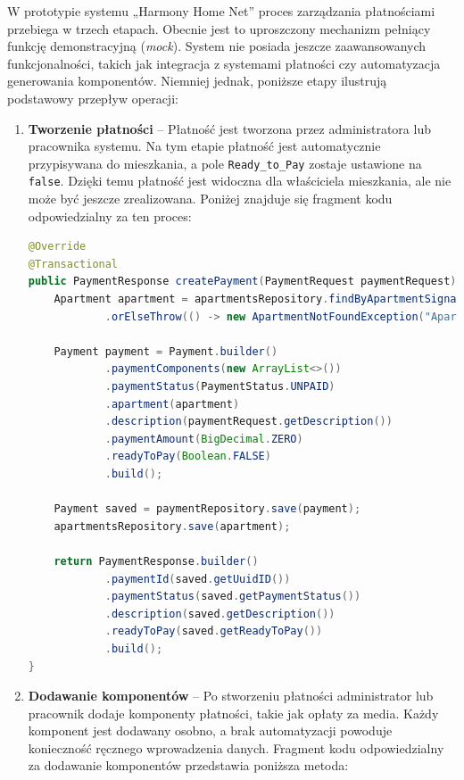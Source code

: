 W prototypie systemu „Harmony Home Net” proces zarządzania płatnościami przebiega w trzech etapach. Obecnie jest to uproszczony mechanizm pełniący funkcję demonstracyjną (\emph{mock}). System nie posiada jeszcze zaawansowanych funkcjonalności, takich jak integracja z systemami płatności czy automatyzacja generowania komponentów. Niemniej jednak, poniższe etapy ilustrują podstawowy przepływ operacji:

\begin{enumerate}
    \item \textbf{Tworzenie płatności} -- Płatność jest tworzona przez administratora lub pracownika systemu. Na tym etapie płatność jest automatycznie przypisywana do mieszkania, a pole \texttt{Ready\_to\_Pay} zostaje ustawione na \texttt{false}. Dzięki temu płatność jest widoczna dla właściciela mieszkania, ale nie może być jeszcze zrealizowana. Poniżej znajduje się fragment kodu odpowiedzialny za ten proces:

\begin{lstlisting}[language=Java, caption=Fragment metody \texttt{createPayment}]
@Override
@Transactional
public PaymentResponse createPayment(PaymentRequest paymentRequest) throws ApartmentNotFoundException {
    Apartment apartment = apartmentsRepository.findByApartmentSignature(paymentRequest.getApartmentSignature())
            .orElseThrow(() -> new ApartmentNotFoundException("Apartment: " + paymentRequest.getApartmentSignature() + " not found"));

    Payment payment = Payment.builder()
            .paymentComponents(new ArrayList<>())
            .paymentStatus(PaymentStatus.UNPAID)
            .apartment(apartment)
            .description(paymentRequest.getDescription())
            .paymentAmount(BigDecimal.ZERO)
            .readyToPay(Boolean.FALSE)
            .build();

    Payment saved = paymentRepository.save(payment);
    apartmentsRepository.save(apartment);

    return PaymentResponse.builder()
            .paymentId(saved.getUuidID())
            .paymentStatus(saved.getPaymentStatus())
            .description(saved.getDescription())
            .readyToPay(saved.getReadyToPay())
            .build();
}
\end{lstlisting}

    \item \textbf{Dodawanie komponentów} -- Po stworzeniu płatności administrator lub pracownik dodaje komponenty płatności, takie jak opłaty za media. Każdy komponent jest dodawany osobno, a brak automatyzacji powoduje konieczność ręcznego wprowadzenia danych. Fragment kodu odpowiedzialny za dodawanie komponentów przedstawia poniższa metoda:


\end{enumerate}
